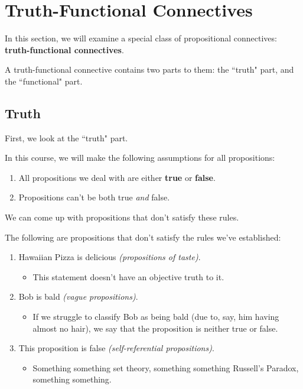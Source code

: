 \documentclass[openany]{book}
\begin{document}
\section{Truth-Functional Connectives}
In this section, we will examine a special class of propositional connectives: \textbf{truth-functional connectives}.

A truth-functional connective contains two parts to them: the ``truth" part, and the ``functional" part.

\subsection{Truth}
First, we look at the ``truth" part.

In this course, we will make the following assumptions for all propositions:
\begin{enumerate}
	\item All propositions we deal with are either \textbf{true} or \textbf{false}.
	\item Propositions can't be both true \textit{and} false.
\end{enumerate}

We can come up with propositions that don't satisfy these rules.
\begin{example}
	The following are propositions that don't satisfy the rules we've established:
	\begin{enumerate}
		\item Hawaiian Pizza is delicious \textit{(propositions of taste)}.
		\begin{itemize}
			\item This statement doesn't have an objective truth to it.
		\end{itemize}
		\item Bob is bald \textit{(vague propositions)}.
		\begin{itemize}
			\item If we struggle to classify Bob as being bald (due to, say, him having almost no hair), we say that the proposition is neither true or false.
		\end{itemize} 
		\item This proposition is false \textit{(self-referential propositions)}.
		\begin{itemize}
			\item Something something set theory, something something Russell's Paradox, something something.
		\end{itemize}
	\end{enumerate}
\end{example}
\end{document}
